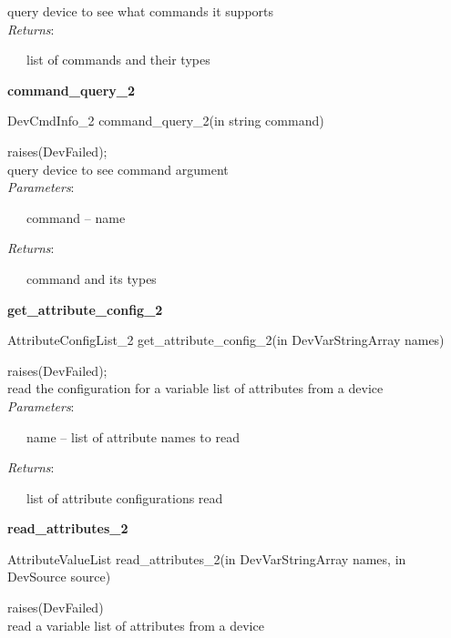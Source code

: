 query device to see what commands it supports\\

\emph{Returns}:

~~~list of commands and their types\\

\begin{flushleft}
\textbf{command\_query\_2}
\par\end{flushleft}

DevCmdInfo\_2 command\_query\_2(in string command)

raises(DevFailed);\\

query device to see command argument\\

\emph{Parameters}:

~~~command – name

\emph{Returns}:

~~~command and its types\\

\begin{flushleft}
\textbf{get\_attribute\_config\_2}
\par\end{flushleft}

AttributeConfigList\_2 get\_attribute\_config\_2(in DevVarStringArray
names)

raises(DevFailed);\\

read the configuration for a variable list of attributes from a device\\

\emph{Parameters}:

~~~name – list of attribute names to read

\emph{Returns}:

~~~list of attribute configurations read\\

\begin{flushleft}
\textbf{read\_attributes\_2}
\par\end{flushleft}

AttributeValueList read\_attributes\_2(in DevVarStringArray names,
in DevSource source)

raises(DevFailed)\\

read a variable list of attributes from a device\\


